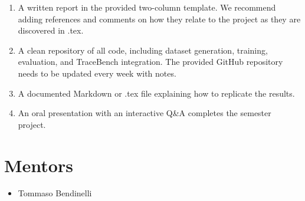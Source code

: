 \documentclass[11pt]{article}
\begin{document}
\begin{enumerate}[label=\arabic*.]
    \item A written report in the provided two-column template. We recommend adding references and comments on how they relate to the project as they are discovered in .tex.
    \item A clean repository of all code, including dataset generation, training, evaluation, and TraceBench integration.
    The provided GitHub repository needs to be updated every week with notes.
    \item A documented Markdown or .tex file explaining how to replicate the results.
    \item An oral presentation with an interactive Q\&A completes the semester project.
\end{enumerate}

\section*{Mentors}
\begin{itemize}
    \item Tommaso Bendinelli
\end{itemize}

\ifdefined\tracebenchDocsCombinedManualMode
\else
  
  
\fi

\restoregeometry
\pagestyle{fancy}
\endgroup
\end{document}
